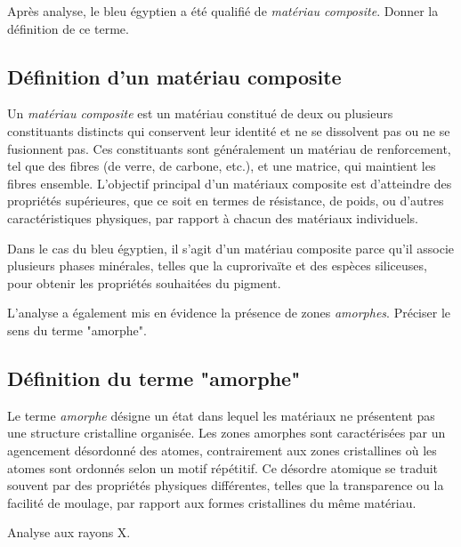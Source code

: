 \documentclass[answers]{exam}
\begin{document}
\begin{questions}
\question[0.5] Après analyse, le bleu égyptien a été qualifié de \emph{matériau composite}. Donner la définition de ce terme.


\begin{solution}
\subsection*{Définition d'un matériau composite}

Un \emph{matériau composite} est un matériau constitué de deux ou plusieurs constituants distincts qui conservent leur identité et ne se dissolvent pas ou ne se fusionnent pas. Ces constituants sont généralement un matériau de renforcement, tel que des fibres (de verre, de carbone, etc.), et une matrice, qui maintient les fibres ensemble. L'objectif principal d'un matériaux composite est d'atteindre des propriétés supérieures, que ce soit en termes de résistance, de poids, ou d'autres caractéristiques physiques, par rapport à chacun des matériaux individuels.

Dans le cas du bleu égyptien, il s'agit d'un matériau composite parce qu'il associe plusieurs phases minérales, telles que la cuprorivaïte et des espèces siliceuses, pour obtenir les propriétés souhaitées du pigment.
\end{solution}

\question[0.5] L'analyse a également mis en évidence la présence de zones \emph{amorphes}. Préciser le sens du terme "amorphe".



\begin{solution}
\subsection*{Définition du terme "amorphe"}

Le terme \emph{amorphe} désigne un état dans lequel les matériaux ne présentent pas une structure cristalline organisée. Les zones amorphes sont caractérisées par un agencement désordonné des atomes, contrairement aux zones cristallines où les atomes sont ordonnés selon un motif répétitif. Ce désordre atomique se traduit souvent par des propriétés physiques différentes, telles que la transparence ou la facilité de moulage, par rapport aux formes cristallines du même matériau.
\end{solution}

\question[2.5] Analyse aux rayons X.
\end{questions}
\end{document}
